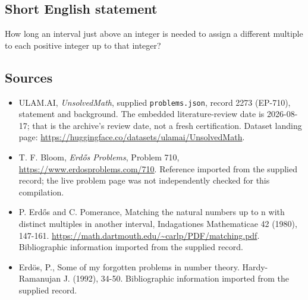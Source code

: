 \documentclass[11pt,a4paper]{article}
\begin{document}
\subsection{Short English statement}

How long an interval just above an integer is needed to assign a different multiple to each positive integer up to that integer?

\subsection{Sources}

{\small

\begin{itemize}

\item[\hypertarget{source:2273:1}{S1}] ULAM.AI, \emph{UnsolvedMath}, supplied \texttt{problems.json}, record 2273 (EP-710), statement and background. The embedded literature-review date is 2026-08-17; that is the archive’s review date, not a fresh certification. Dataset landing page: \url{https://huggingface.co/datasets/ulamai/UnsolvedMath}.

\item[\hypertarget{source:2273:2}{S2}] T. F. Bloom, \emph{Erdős Problems}, Problem 710, \url{https://www.erdosproblems.com/710}. Reference imported from the supplied record; the live problem page was not independently checked for this compilation.

\item[\hypertarget{source:2273:3}{S3}] P. Erdős and C. Pomerance, Matching the natural numbers up to n with distinct multiples in another interval, Indagationes Mathematicae 42 (1980), 147-161. \url{https://math.dartmouth.edu/~carlp/PDF/matching.pdf}. Bibliographic information imported from the supplied record.

\item[\hypertarget{source:2273:4}{S4}] Erd\"{o}s, P., Some of my forgotten problems in number theory. Hardy-Ramanujan J. (1992), 34-50. Bibliographic information imported from the supplied record.

\end{itemize}

}

\label{end:2273}
\end{document}
